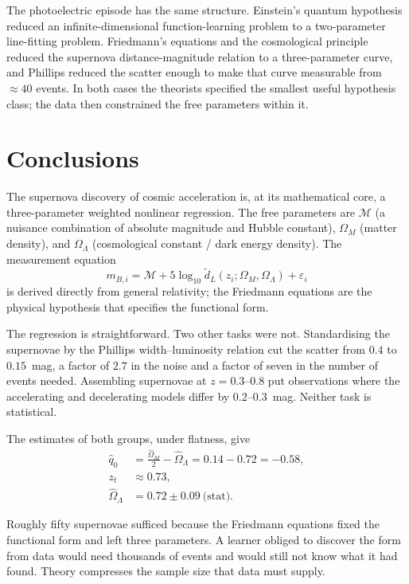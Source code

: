 \documentclass[12pt]{article}
\begin{document}
The photoelectric episode has the same structure.  Einstein's quantum
hypothesis reduced an infinite-dimensional function-learning problem to a
two-parameter line-fitting problem.  Friedmann's equations and the
cosmological principle reduced the supernova distance-magnitude relation to a
three-parameter curve, and Phillips reduced the scatter enough to make that
curve measurable from $\approx 40$ events.  In both cases the theorists
specified the smallest useful hypothesis class; the data then constrained the
free parameters within it.

\section{Conclusions}
\label{sec:conclusions}

The supernova discovery of cosmic acceleration is, at its mathematical
core, a three-parameter weighted nonlinear regression.  The free
parameters are $\mathcal{M}$ (a nuisance combination of absolute
magnitude and Hubble constant), $\Omega_M$ (matter density), and
$\Omega_\Lambda$ (cosmological constant / dark energy density).  The
measurement equation
\[
  m_{B,i} = \mathcal{M} + 5\log_{10}\tilde d_L(z_i;\Omega_M,\Omega_\Lambda)
  + \varepsilon_i
\]
is derived directly from general relativity; the Friedmann equations
are the physical hypothesis that specifies the functional form.

The regression is straightforward.  Two other tasks were not.
Standardising the supernovae by the Phillips width--luminosity relation cut
the scatter from $0.4$ to $0.15$~mag, a factor of $2.7$ in the noise and a
factor of seven in the number of events needed.  Assembling supernovae at
$z = 0.3$--$0.8$ put observations where the accelerating and decelerating
models differ by $0.2$--$0.3$~mag.  Neither task is statistical.

The estimates of both groups, under flatness, give
\begin{align*}
  \hat q_0 &= \frac{\hat\Omega_M}{2} - \hat\Omega_\Lambda
           = 0.14 - 0.72 = -0.58, \\
  z_t      &\approx 0.73, \\
  \hat\Omega_\Lambda &= 0.72 \pm 0.09~\text{(stat)}.
\end{align*}

Roughly fifty supernovae sufficed because the Friedmann equations fixed the
functional form and left three parameters.  A learner obliged to discover the
form from data would need thousands of events and would still not know what it
had found.  Theory compresses the sample size that data must supply.
\end{document}
